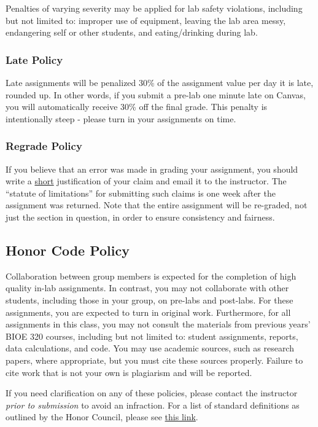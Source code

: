 \documentclass{article}
\begin{document}
Penalties of varying severity may be applied for lab safety violations, including but not limited to: improper use of equipment, leaving the lab area messy, endangering self or other students, and eating/drinking during lab.

\subsubsection*{Late Policy}
Late assignments will be penalized 30\% of the assignment value per day it is late, rounded up. In other words, if you submit a pre-lab one minute late on Canvas, you will automatically receive 30\% off the final grade. This penalty is intentionally steep - please turn in your assignments on time.

\subsubsection*{Regrade Policy}
If you believe that an error was made in grading your assignment, you should write a \underline{short} justification of your claim and email it to the instructor. The “statute of limitations” for submitting such claims is one week after the assignment was returned. Note that the entire assignment will be re-graded, not just the section in question, in order to ensure consistency and fairness.

\subsection*{Honor Code Policy}
Collaboration between group members is expected for the completion of high quality in-lab assignments. In contrast, you may not collaborate with other students, including those in your group, on pre-labs and post-labs. For these assignments, you are expected to turn in original work. Furthermore, for all assignments in this class, you may not consult the materials from previous years' BIOE 320 courses, including but not limited to: student assignments, reports, data calculations, and code. You may use academic sources, such as research papers, where appropriate, but you must cite these sources properly. Failure to cite work that is not your own is plagiarism and will be reported.

If you need clarification on any of these policies, please contact the instructor \textit{prior to submission} to avoid an infraction. For a list of standard definitions as outlined by the Honor Council, please see \href{https://cpb-us-e1.wpmucdn.com/blogs.rice.edu/dist/c/490/files/2022/08/Honor-Council-Standard-Definitions-and-Policies.pdf}{this link}.
\end{document}

